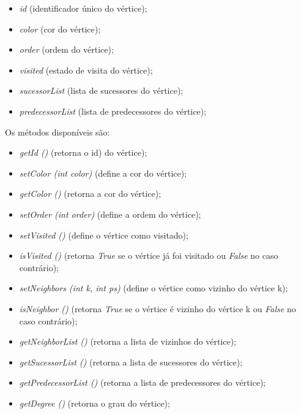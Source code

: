 \documentclass[a4paper,10pt]{report}
\begin{document}
\begin{itemize}
    \begin{itemize}
        \item \textit{id} (identificador único do vértice);
        \item \textit{color} (cor do vértice);
        \item \textit{order} (ordem do vértice);
        \item \textit{visited} (estado de visita do vértice);
        \item \textit{sucessorList} (lista de sucessores do vértice);
        \item \textit{predecessorList} (lista de predecessores do vértice);
    \end{itemize}
    Os métodos disponíveis são:
    \begin{itemize}
        \item \textit{getId ()} (retorna o id) do vértice);
        \item \textit{setColor (int color)} (define a cor do vértice);
        \item \textit{getColor ()} (retorna a cor do vértice);
        \item \textit{setOrder (int order)} (define a ordem do vértice);
        \item \textit{setVisited ()} (define o vértice como visitado);
        \item \textit{isVisited ()} (retorna \textit{True} se o vértice já foi visitado ou \textit{False} no caso contrário);
        \item \textit{setNeighbors (int k, int ps)} (define o vértice como vizinho do vértice k);
        \item \textit{isNeighbor ()} (retorna \textit{True} se o vértice é vizinho do vértice k ou \textit{False} no caso contrário);
        \item \textit{getNeighborList ()} (retorna a lista de vizinhos do vértice);
        \item \textit{getSucessorList ()} (retorna a lista de sucessores do vértice);
        \item \textit{getPredecessorList ()} (retorna a lista de predecessores do vértice);
        \item \textit{getDegree ()} (retorna o grau do vértice);
    \end{itemize}
\end{itemize}
\end{document}
